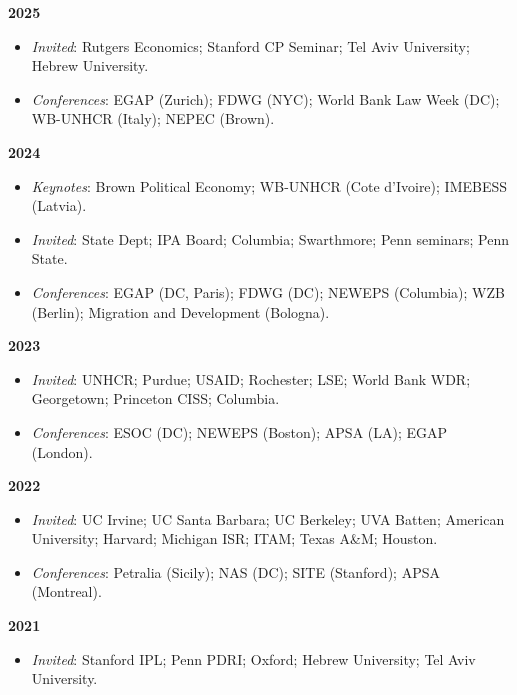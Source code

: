 \documentclass[10pt,a4paper]{article}
\begin{document}
\textbf{2025}
\begin{itemize}[leftmargin=1em, itemsep=0pt, topsep=2pt, label={}]
\item \textit{Invited}: Rutgers Economics; Stanford CP Seminar; Tel Aviv University; Hebrew University.
\item \textit{Conferences}: EGAP (Zurich); FDWG (NYC); World Bank Law Week (DC); WB-UNHCR (Italy); NEPEC (Brown).
\end{itemize}

\textbf{2024}
\begin{itemize}[leftmargin=1em, itemsep=0pt, topsep=2pt, label={}]
\item \textit{Keynotes}: Brown Political Economy; WB-UNHCR (Cote d'Ivoire); IMEBESS (Latvia).
\item \textit{Invited}: State Dept; IPA Board; Columbia; Swarthmore; Penn seminars; Penn State.
\item \textit{Conferences}: EGAP (DC, Paris); FDWG (DC); NEWEPS (Columbia); WZB (Berlin); Migration and Development (Bologna).
\end{itemize}

\textbf{2023}
\begin{itemize}[leftmargin=1em, itemsep=0pt, topsep=2pt, label={}]
\item \textit{Invited}: UNHCR; Purdue; USAID; Rochester; LSE; World Bank WDR; Georgetown; Princeton CISS; Columbia.
\item \textit{Conferences}: ESOC (DC); NEWEPS (Boston); APSA (LA); EGAP (London).
\end{itemize}

\textbf{2022}
\begin{itemize}[leftmargin=1em, itemsep=0pt, topsep=2pt, label={}]
\item \textit{Invited}: UC Irvine; UC Santa Barbara; UC Berkeley; UVA Batten; American University; Harvard; Michigan ISR; ITAM; Texas A\&M; Houston.
\item \textit{Conferences}: Petralia (Sicily); NAS (DC); SITE (Stanford); APSA (Montreal).
\end{itemize}

\textbf{2021}
\begin{itemize}[leftmargin=1em, itemsep=0pt, topsep=2pt, label={}]
\item \textit{Invited}: Stanford IPL; Penn PDRI; Oxford; Hebrew University; Tel Aviv University.
\end{itemize}

\end{document}
